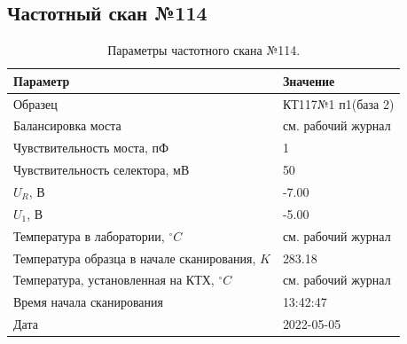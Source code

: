\subsection{Частотный скан №114}
\begin{table}[!ht]
    \centering
    \caption{Параметры частотного скана №114.}
    \begin{tabular}{|l|l|}
        \hline
        Параметр                                       & Значение                  \\ \hline
        Образец                                        & КТ117№1 п1(база 2)        \\ \hline
        Балансировка моста                             & см. рабочий журнал        \\ \hline
        Чувствительность моста, пФ                     & 1                         \\ \hline
        Чувствительность селектора, мВ                 & 50                        \\ \hline
        $U_R$, В                                       & -7.00                     \\ \hline
        $U_1$, В                                       & -5.00                     \\ \hline
        Температура в лаборатории, $^\circ C$          & см. рабочий журнал        \\ \hline
        Температура образца в начале сканирования, $K$ & 283.18                    \\ \hline
        Температура, установленная на КТХ, $^\circ C$  & см. рабочий журнал        \\ \hline
        Время начала сканирования                      & 13:42:47                  \\ \hline
        Дата                                           & 2022-05-05                \\ \hline
    \end{tabular}
    \label{table:frequency_scan_114}
\end{table}

